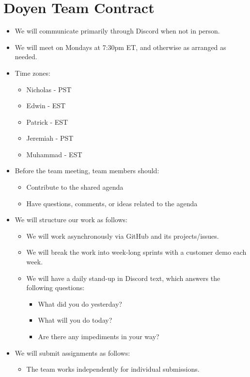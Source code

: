 \section{Doyen Team Contract}

\begin{itemize}
    \item We will communicate primarily through Discord when not in person.
    \item We will meet on Mondays at 7:30pm ET, and otherwise as arranged as needed.
    \item Time zones:
    \begin{itemize}
        \item Nicholas - PST
        \item Edwin - EST
        \item Patrick - EST
        \item Jeremiah - PST
        \item Muhammad - EST
    \end{itemize}
    \item Before the team meeting, team members should:
    \begin{itemize}
        \item Contribute to the shared agenda
        \item Have questions, comments, or ideas related to the agenda
    \end{itemize}
    \item We will structure our work as follows:
    \begin{itemize}
        \item We will work asynchronously via GitHub and its projects/issues.
        \item We will break the work into week-long sprints with a customer demo each week.
        \item We will have a daily stand-up in Discord text, which answers the following questions:
        \begin{itemize}
            \item What did you do yesterday?
            \item What will you do today?
            \item Are there any impediments in your way?
        \end{itemize}
    \end{itemize}
    \item We will submit assignments as follows:
    \begin{itemize}
        \item The team works independently for individual submissions.

\end{itemize}
\end{itemize}
